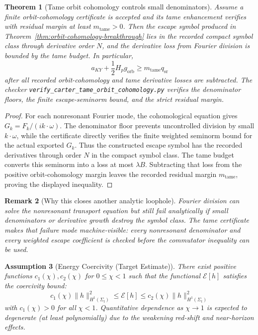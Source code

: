 \documentclass[12pt,a4paper]{article}
\newtheorem{theorem}{Theorem}[section]
\newtheorem{remark}[theorem]{Remark}
\newtheorem{assumption}[theorem]{Assumption}
\begin{document}
\begin{theorem}[Tame orbit cohomology controls small denominators]\label{thm:tame-orbit-cohomology}
Assume a finite orbit-cohomology certificate is accepted and its tame
enhancement verifies with residual margin at least
$m_{\mathrm{tame}}>0$.  Then the escape symbol produced in
Theorem~\ref{thm:orbit-cohomology-breakthrough} lies in the recorded compact
symbol class through derivative order $N$, and the derivative loss from Fourier
division is bounded by the tame budget.  In particular,
\[
a_{KY}+\frac12H_pg_{\mathrm{orb}}
\ge m_{\mathrm{tame}}q_{\mathrm{sr}}
\]
after all recorded orbit-cohomology and tame derivative losses are subtracted.
The checker \texttt{verify\_carter\_tame\_orbit\_cohomology.py} verifies the
denominator floors, the finite escape-seminorm bound, and the strict residual
margin.
\end{theorem}

\begin{proof}
For each nonresonant Fourier mode, the cohomological equation gives
$G_k=F_k/(i k\cdot\omega)$.  The denominator floor prevents uncontrolled
division by small $k\cdot\omega$, while the certificate directly verifies the
finite weighted seminorm bound for the actual exported $G_k$.  Thus the
constructed escape symbol has the recorded derivatives through order $N$ in
the compact symbol class.  The tame budget converts this seminorm into a
loss at most $\lambda B$.  Subtracting that loss from the positive
orbit-cohomology margin leaves the recorded residual margin
$m_{\mathrm{tame}}$, proving the displayed inequality.
\end{proof}

\begin{remark}[Why this closes another analytic loophole]
Fourier division can solve the nonresonant transport equation but still fail
analytically if small denominators or derivative growth destroy the symbol
class.  The tame certificate makes that failure mode machine-visible: every
nonresonant denominator and every weighted escape coefficient is checked before
the commutator inequality can be used.
\end{remark}

\begin{assumption}[Energy Coercivity (Target Estimate)]\label{thm:full-coercivity}
There exist positive functions $c_1(\chi), c_2(\chi)$ for $0\leq \chi < 1$ such that the functional $\mathcal{E}[h]$ satisfies the coercivity bound:
\begin{equation}
c_1(\chi) \|h\|_{H^1(\Sigma_t)}^2 \leq \mathcal{E}[h] \leq c_2(\chi) \|h\|_{H^1(\Sigma_t)}^2
\end{equation}
with $c_1(\chi) > 0$ for all $\chi < 1$. Quantitative dependence as $\chi\to 1$ is expected to degenerate (at least polynomially) due to the weakening red-shift and near-horizon effects.
\end{assumption}
\end{document}
